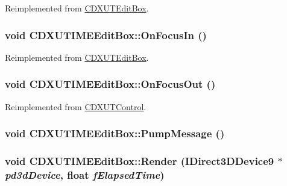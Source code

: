 Reimplemented from \hyperlink{class_c_d_x_u_t_edit_box_adca915977ba1b8019594ef5d350ed03e}{CDXUTEditBox}.\hypertarget{class_c_d_x_u_t_i_m_e_edit_box_a6f3ada4a18eb810420806d5112fd7de6}{
\subsubsection[{OnFocusIn}]{\setlength{\rightskip}{0pt plus 5cm}void CDXUTIMEEditBox::OnFocusIn ()}}
\label{class_c_d_x_u_t_i_m_e_edit_box_a6f3ada4a18eb810420806d5112fd7de6}


Reimplemented from \hyperlink{class_c_d_x_u_t_edit_box_adc767031600f1ea99ebcf533e00d7948}{CDXUTEditBox}.\hypertarget{class_c_d_x_u_t_i_m_e_edit_box_a32592319ff970787b0cfa1c59b61f4d6}{
\subsubsection[{OnFocusOut}]{\setlength{\rightskip}{0pt plus 5cm}void CDXUTIMEEditBox::OnFocusOut ()}}
\label{class_c_d_x_u_t_i_m_e_edit_box_a32592319ff970787b0cfa1c59b61f4d6}


Reimplemented from \hyperlink{class_c_d_x_u_t_control_afd5667a4ba9349e98db8c27a1b1d280d}{CDXUTControl}.\hypertarget{class_c_d_x_u_t_i_m_e_edit_box_a3abd5952d806d278c1778c2b27327d25}{
\subsubsection[{PumpMessage}]{\setlength{\rightskip}{0pt plus 5cm}void CDXUTIMEEditBox::PumpMessage ()}}
\label{class_c_d_x_u_t_i_m_e_edit_box_a3abd5952d806d278c1778c2b27327d25}
\hypertarget{class_c_d_x_u_t_i_m_e_edit_box_aa473937c56d6feef6777fd62b4d5a48c}{
\subsubsection[{Render}]{\setlength{\rightskip}{0pt plus 5cm}void CDXUTIMEEditBox::Render (IDirect3DDevice9 $\ast$ {\em pd3dDevice}, \/  float {\em fElapsedTime})}}
\label{class_c_d_x_u_t_i_m_e_edit_box_aa473937c56d6feef6777fd62b4d5a48c}


